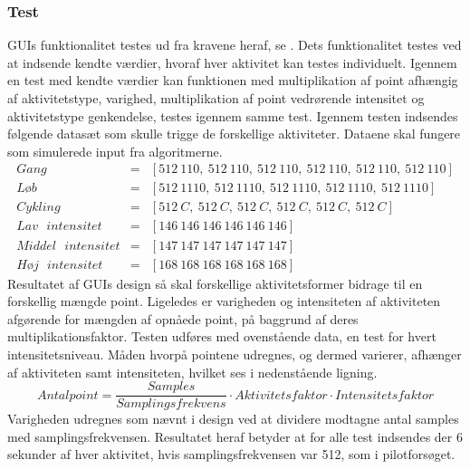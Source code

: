 \subsubsection{Test}
GUIs funktionalitet testes ud fra kravene heraf, se . Dets funktionalitet testes ved at indsende kendte værdier, hvoraf hver aktivitet kan testes individuelt. Igennem en test med kendte værdier kan funktionen med multiplikation af point afhængig af aktivitetstype, varighed, multiplikation af point vedrørende intensitet og aktivitetstype genkendelse, testes igennem samme test.
Igennem testen indsendes følgende datasæt som skulle trigge de forskellige aktiviteter. Dataene skal fungere som simulerede input fra algoritmerne. 
\begin{eqnarray*}
	Gang &=& [512~110,~512~110,~512~110,~512~110,~512~110,~512~110] \\ 
	L\text{ø}b &=& [512~1110,~512~1110,~512~1110,~512~1110,~512~1110] \\ 
	Cykling &=& [512~C,~512~C,~512~C,~512~C,~512~C,~512~C] \\
	Lav\text{ }intensitet &=& [146~146~146~146~146~146] \\ 
	Middel\text{ }intensitet &=& [147~147~147~147~147~147] \\ 
	H\text{ø}j\text{ }intensitet &=& [168~168~168~168~168~168] 
\end{eqnarray*}
Resultatet af GUIs design så skal forskellige aktivitetsformer bidrage til en forskellig mængde point. Ligeledes er varigheden og intensiteten  af aktiviteten afgørende for mængden af opnåede point, på baggrund af deres multiplikationsfaktor. Testen udføres med ovenstående data, en test for hvert intensitetsniveau. Måden hvorpå pointene udregnes, og dermed varierer, afhænger af aktiviteten samt intensiteten, hvilket ses i nedenstående ligning. 
\begin{equation*}
Antal point = \frac{Samples}{Samplingsfrekvens} \cdot Aktivitetsfaktor \cdot Intensitetsfaktor
\end{equation*}
Varigheden udregnes som nævnt i design ved at dividere modtagne antal samples med samplingsfrekvensen. Resultatet heraf betyder at for alle test indsendes der 6 sekunder af hver aktivitet, hvis samplingsfrekvensen var 512, som i pilotforsøget.
